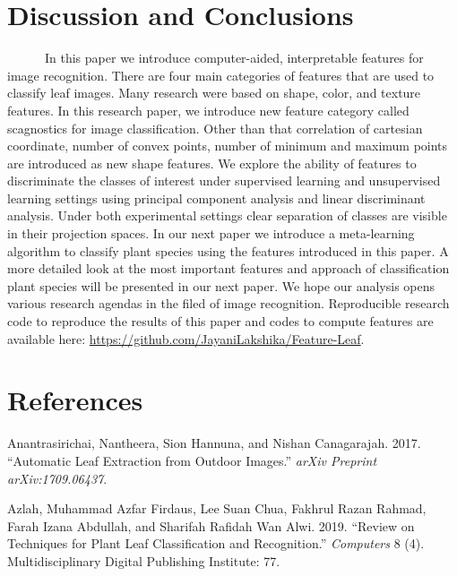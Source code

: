 \documentclass{article}
\begin{document}
\newpage

\hypertarget{discussion-and-conclusions}{%
\section{Discussion and Conclusions}\label{discussion-and-conclusions}}

~~~~~~In this paper we introduce computer-aided, interpretable features
for image recognition. There are four main categories of features that
are used to classify leaf images. Many research were based on shape,
color, and texture features. In this research paper, we introduce new
feature category called scagnostics for image classification. Other than
that correlation of cartesian coordinate, number of convex points,
number of minimum and maximum points are introduced as new shape
features. We explore the ability of features to discriminate the classes
of interest under supervised learning and unsupervised learning settings
using principal component analysis and linear discriminant analysis.
Under both experimental settings clear separation of classes are visible
in their projection spaces. In our next paper we introduce a
meta-learning algorithm to classify plant species using the features
introduced in this paper. A more detailed look at the most important
features and approach of classification plant species will be presented
in our next paper. We hope our analysis opens various research agendas
in the filed of image recognition. Reproducible research code to
reproduce the results of this paper and codes to compute features are
available here: \url{https://github.com/JayaniLakshika/Feature-Leaf}.

\hypertarget{references}{%
\section*{References}\label{references}}

\hypertarget{refs}{}
\leavevmode\hypertarget{ref-DBLP}{}%
Anantrasirichai, Nantheera, Sion Hannuna, and Nishan Canagarajah. 2017.
``Automatic Leaf Extraction from Outdoor Images.'' \emph{arXiv Preprint
arXiv:1709.06437}.

\leavevmode\hypertarget{ref-articlepl}{}%
Azlah, Muhammad Azfar Firdaus, Lee Suan Chua, Fakhrul Razan Rahmad,
Farah Izana Abdullah, and Sharifah Rafidah Wan Alwi. 2019. ``Review on
Techniques for Plant Leaf Classification and Recognition.''
\emph{Computers} 8 (4). Multidisciplinary Digital Publishing Institute:
77.
\end{document}
